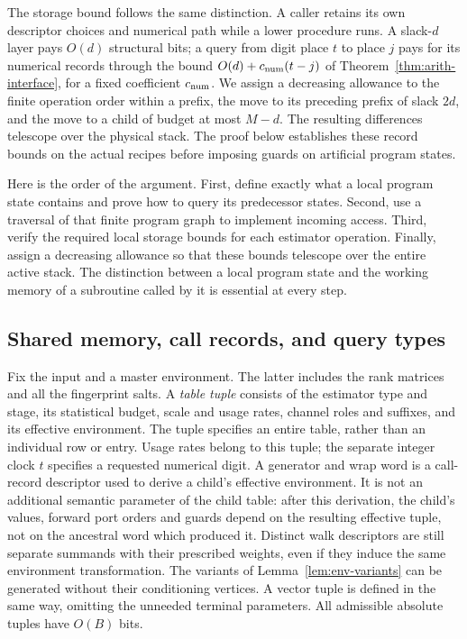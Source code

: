 The storage bound follows the same distinction.  A caller retains its
own descriptor choices and numerical path while a lower procedure runs.
A slack-$d$ layer pays $O(d)$ structural bits; a query from digit place
$t$ to place $j$ pays for its numerical records through the bound
$O(d)+c_{\rm num}(t-j)$ of Theorem~\ref{thm:arith-interface}, for a
fixed coefficient $c_{\rm num}$.  We assign a decreasing
allowance to the finite operation order within a prefix, the move to its
preceding prefix of slack $2d$, and the move to a child of budget at most
$M-d$.  The resulting differences telescope over the physical stack.
The proof below establishes these record bounds on the actual recipes before imposing guards on artificial program states.

Here is the order of the argument. First, define exactly what a local program state contains and prove how to query its predecessor states. Second, use a traversal of that finite program graph to implement incoming access. Third, verify the required local storage bounds for each estimator operation. Finally, assign a decreasing allowance so that these bounds telescope over the entire active stack. The distinction between a local program state and the working memory of a subroutine called by it is essential at every step.

\subsection{Shared memory, call records, and query types}\label{sec:ctrl-model}

Fix the input and a master environment.  The latter includes the rank
matrices and all the fingerprint salts.  A \emph{table tuple} consists of
the estimator type and stage, its statistical budget, scale and usage
rates, channel roles and suffixes, and its effective environment.  The
tuple specifies an entire table, rather than an individual row or entry.
Usage rates belong to this tuple; the separate integer clock $t$
specifies a requested numerical digit.
A generator and wrap word is a call-record descriptor used to derive a
child's effective environment.  It is not an additional semantic
parameter of the child table: after this derivation, the child's values,
forward port orders and guards depend on the resulting effective tuple,
not on the ancestral word which produced it.  Distinct walk descriptors
are still separate summands with their prescribed weights, even if they
induce the same environment transformation.  The variants of
Lemma~\ref{lem:env-variants} can be generated without their conditioning
vertices.  A vector tuple is defined in the same way, omitting the
unneeded terminal parameters.  All admissible absolute tuples have
$O(B)$ bits.

